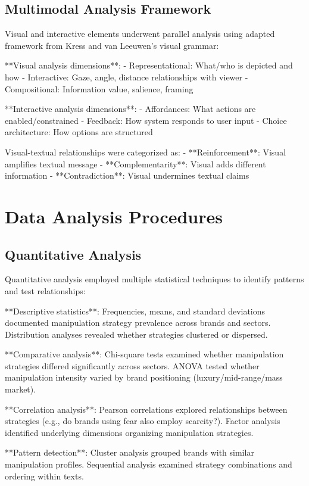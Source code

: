 \subsection{Multimodal Analysis Framework}

Visual and interactive elements underwent parallel analysis using adapted framework from Kress and van Leeuwen's visual grammar:

**Visual analysis dimensions**:
- Representational: What/who is depicted and how
- Interactive: Gaze, angle, distance relationships with viewer
- Compositional: Information value, salience, framing

**Interactive analysis dimensions**:
- Affordances: What actions are enabled/constrained
- Feedback: How system responds to user input
- Choice architecture: How options are structured

Visual-textual relationships were categorized as:
- **Reinforcement**: Visual amplifies textual message
- **Complementarity**: Visual adds different information
- **Contradiction**: Visual undermines textual claims

\section{Data Analysis Procedures}
\label{sec:analysis_procedures}

\subsection{Quantitative Analysis}

Quantitative analysis employed multiple statistical techniques to identify patterns and test relationships:

**Descriptive statistics**: Frequencies, means, and standard deviations documented manipulation strategy prevalence across brands and sectors. Distribution analyses revealed whether strategies clustered or dispersed.

**Comparative analysis**: Chi-square tests examined whether manipulation strategies differed significantly across sectors. ANOVA tested whether manipulation intensity varied by brand positioning (luxury/mid-range/mass market).

**Correlation analysis**: Pearson correlations explored relationships between strategies (e.g., do brands using fear also employ scarcity?). Factor analysis identified underlying dimensions organizing manipulation strategies.

**Pattern detection**: Cluster analysis grouped brands with similar manipulation profiles. Sequential analysis examined strategy combinations and ordering within texts.

